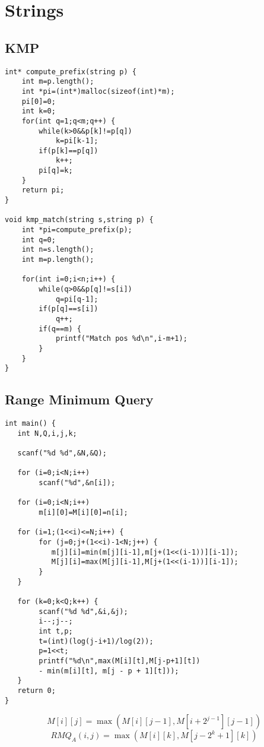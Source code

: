 \section{Strings}

\subsection{KMP}
\begin{verbatim}
int* compute_prefix(string p) {
    int m=p.length();
    int *pi=(int*)malloc(sizeof(int)*m);
    pi[0]=0;
    int k=0;
    for(int q=1;q<m;q++) {
        while(k>0&&p[k]!=p[q])
            k=pi[k-1];
        if(p[k]==p[q])
            k++;
        pi[q]=k;
    }
    return pi;
}

void kmp_match(string s,string p) {
    int *pi=compute_prefix(p);
    int q=0;
    int n=s.length();
    int m=p.length();

    for(int i=0;i<n;i++) {
        while(q>0&&p[q]!=s[i])
            q=pi[q-1];
        if(p[q]==s[i])
            q++;
        if(q==m) {
            printf("Match pos %d\n",i-m+1);
        }
    }
}
\end{verbatim}

\subsection{Range Minimum Query}
\begin{verbatim}
int main() {
   int N,Q,i,j,k;

   scanf("%d %d",&N,&Q);

   for (i=0;i<N;i++)
	    scanf("%d",&n[i]);

   for (i=0;i<N;i++)
	    m[i][0]=M[i][0]=n[i];

   for (i=1;(1<<i)<=N;i++) {
	    for (j=0;j+(1<<i)-1<N;j++) {
	       m[j][i]=min(m[j][i-1],m[j+(1<<(i-1))][i-1]);
	       M[j][i]=max(M[j][i-1],M[j+(1<<(i-1))][i-1]);
	    }
   }

   for (k=0;k<Q;k++) {
	    scanf("%d %d",&i,&j);
	    i--;j--;
	    int t,p;
	    t=(int)(log(j-i+1)/log(2));
	    p=1<<t;
	    printf("%d\n",max(M[i][t],M[j-p+1][t])
	    - min(m[i][t], m[j - p + 1][t]));
   }
   return 0;
}
\end{verbatim}
$$
M[i][j]=\max(M[i][j-1],M[i+2^{j-1}][j-1])
$$
$$
RMQ_A(i,j)=\max(M[i][k],M[j-2^k+1][k])
$$

